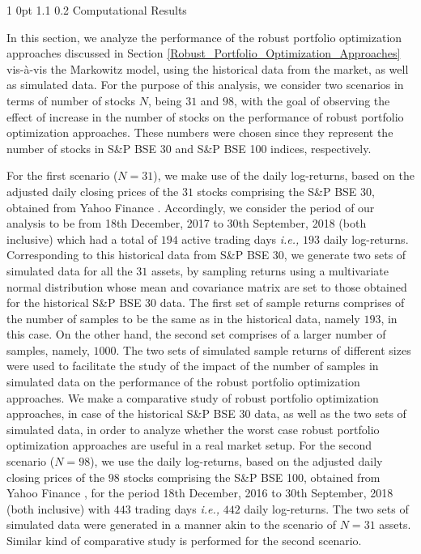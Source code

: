 \documentclass[12pt]{article}
\makeatletter
\numberwithin{equation}{section}
\renewcommand{\section}{
  \@startsection
  {section}%
  {1}%
  {0pt}%
  {1.1\baselineskip}%
  {0.2\baselineskip}%
  {\sc \centering}%
}
\makeatother
\begin{document}
\section{Computational Results}
\label{Computational_Results}

In this section, we analyze the performance of the robust portfolio optimization approaches discussed in Section \ref{Robust_Portfolio_Optimization_Approaches} vis-\`a-vis the Markowitz model, using the historical data from the market, as well as simulated data. For the purpose of this analysis, we consider two scenarios in terms of number of stocks $N$, being $31$ and $98$, with the goal of observing the effect of increase in the number of stocks on the performance of robust portfolio optimization approaches. These numbers were chosen since they represent the number of stocks in S\&P BSE 30 and S\&P BSE 100 indices, respectively.

For the first scenario ($N=31$), we make use of the daily log-returns, based on the adjusted daily closing prices of the $31$ stocks comprising the S\&P BSE 30, obtained from Yahoo Finance \cite{yf}. Accordingly, we consider the period of our analysis to be from 18th December, 2017 to 30th September, 2018 (both inclusive) which had a total of $194$ active trading days \textit{i.e.,} $193$ daily log-returns. Corresponding to this historical data from S\&P BSE 30, we generate two sets of simulated data for all the $31$ assets, by sampling returns using a multivariate normal distribution whose mean and covariance matrix are set to those obtained for the historical S\&P BSE 30 data. The first set of sample returns comprises of the number of samples to be the same as in the historical data, namely $193$, in this case. On the other hand, the second set comprises of a larger number of samples, namely, $1000$. The two sets of simulated sample returns of different sizes were used to facilitate the study of the impact of the number of samples in simulated data on the performance of the robust portfolio optimization approaches. We make a comparative study of robust portfolio optimization approaches, in case of the historical S\&P BSE 30 data, as well as the two sets of simulated data, in order to analyze whether the worst case robust portfolio optimization approaches are useful in a real market setup. For the second scenario ($N=98$), we use the daily log-returns, based on the adjusted daily closing prices of the $98$ stocks comprising the S\&P BSE 100, obtained from Yahoo Finance \cite{yf}, for the period 18th December, 2016 to 30th September, 2018 (both inclusive) with $443$ trading days \textit{i.e.,} $442$ daily log-returns. The two sets of simulated data were generated in a manner akin to the scenario of $N=31$ assets. Similar kind of comparative study is performed for the second scenario.
\end{document}
